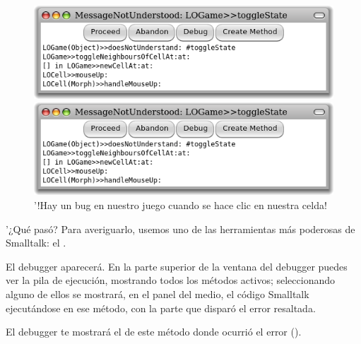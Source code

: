 \documentclass[a4paper,10pt,twoside]{book}
\begin{document}
\begin{figure}[ht]
\ifluluelse
	{\centerline{\includegraphics[width=\textwidth]{Error}}}
	{\centerline{\includegraphics[scale=0.7]{Error}}}
\caption{'!Hay un bug en nuestro juego cuando se hace clic en nuestra celda!
}
\end{figure}

\noindent
'¿Qu\'e pas\'o? Para averiguarlo, usemos uno de las herramientas m\'as poderosas de Smalltalk: el .

El debugger aparecer\'a.
En la parte superior de la ventana del debugger puedes ver la pila de ejecuci\'on, mostrando todos los m\'etodos activos; seleccionando alguno de ellos se mostrar\'a, en el panel del medio, el c\'odigo Smalltalk ejecut\'andose en ese m\'etodo, con la parte que dispar\'o el error resaltada. 

El debugger te mostrar\'a el  de este m\'etodo donde ocurri\'o el error ().
\end{document}
